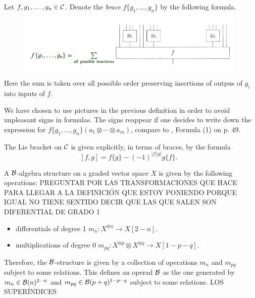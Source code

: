 \documentclass[TFM.tex]{subfiles}
\begin{document}
\begin{defi}
Let $f,g_1,\dots, g_n\in \mathcal{C}$. Denote the \emph{brace} $f\{g_1,\dots, g_n\}$ by the following formula.

\begin{figure}[h!]
\includegraphics[scale=0.7]{Imagenes//brace}
\end{figure}

Here the sum is taken over all possible order preserving insertions of outpus of $g_i$ into
inputs of $f$.
\end{defi}

\begin{remark}
We have chosen to use pictures in the previous definition in order to avoid unpleasant
signs in formulas. The signs reappear if one decides to write down the expression for
$f\{g_1,\dots, g_n\}(a_1\otimes \cdots \otimes a_m)$, compare to \cite{GJHinich}, Formula (1) on p. 49.
\end{remark}

The Lie bracket on $\mathcal{C}$ is given explicitly, in terms of braces, by the formula %
\[
[f,g]=f\{g\}-(-1)^{|f||g|}g\{f\}.
\]


\begin{defi}
A $\mathcal{B}$-algebra structure on a graded vector space $X$ is given by the following operations: PREGUNTAR POR LAS TRANSFORMACIONES QUE HACE PARA LLEGAR A LA DEFINICIÓN QUE ESTOY PONIENDO PORQUE IGUAL NO TIENE SENTIDO DECIR QUE LAS QUE SALEN SON DIFERENTIAL DE GRADO 1
\begin{itemize}
\item differentials of degree 1 $m_n:X^{\otimes n}\to X[2-n]$.
\item multiplications of degree 0 $m_{pq}:X^{\otimes p}\otimes X^{\otimes q}\to X[1-p-q]$.
\end{itemize}
Therefore, the $\mathcal{B}$-structure is given by a collection of operations $m_n$ and $m_{pq}$
subject to some relations. This defines an operad $\mathcal{B}$ as the one generated by $m_n\in\mathcal{B}(n)^{2-n}$ and $m_{pq}\in\mathcal{B}(p+q)^{1-p-q}$ subject to some relations. LOS SUPERÍNDICES
\end{defi}
\end{document}
